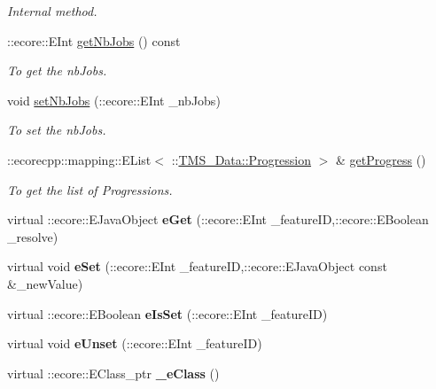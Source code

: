 \begin{DoxyCompactItemize}
\begin{DoxyCompactList}\small\item\em Internal method. \item\end{DoxyCompactList}\item 
::ecore::EInt \hyperlink{classTMS__Data_1_1ListProgression_a11b488649edac3b2358dd3d0d5cd27cd}{getNbJobs} () const 
\begin{DoxyCompactList}\small\item\em To get the nbJobs. \item\end{DoxyCompactList}\item 
void \hyperlink{classTMS__Data_1_1ListProgression_a7b7bb84e28a6725537b97ce45285c3e2}{setNbJobs} (::ecore::EInt \_\-nbJobs)
\begin{DoxyCompactList}\small\item\em To set the nbJobs. \item\end{DoxyCompactList}\item 
::ecorecpp::mapping::EList$<$ ::\hyperlink{classTMS__Data_1_1Progression}{TMS\_\-Data::Progression} $>$ \& \hyperlink{classTMS__Data_1_1ListProgression_a52390d2f627bb0241f8ed38da3195241}{getProgress} ()
\begin{DoxyCompactList}\small\item\em To get the list of Progressions. \item\end{DoxyCompactList}\item 
\hypertarget{classTMS__Data_1_1ListProgression_a5d323eaa4950c9e45d1fd046a3d7a3a3}{
virtual ::ecore::EJavaObject {\bfseries eGet} (::ecore::EInt \_\-featureID,::ecore::EBoolean \_\-resolve)}
\label{classTMS__Data_1_1ListProgression_a5d323eaa4950c9e45d1fd046a3d7a3a3}

\item 
\hypertarget{classTMS__Data_1_1ListProgression_a470c911717f8478995bcc36425fa5777}{
virtual void {\bfseries eSet} (::ecore::EInt \_\-featureID,::ecore::EJavaObject const \&\_\-newValue)}
\label{classTMS__Data_1_1ListProgression_a470c911717f8478995bcc36425fa5777}

\item 
\hypertarget{classTMS__Data_1_1ListProgression_aa5f1ea14a2ec2876666941463420949e}{
virtual ::ecore::EBoolean {\bfseries eIsSet} (::ecore::EInt \_\-featureID)}
\label{classTMS__Data_1_1ListProgression_aa5f1ea14a2ec2876666941463420949e}

\item 
\hypertarget{classTMS__Data_1_1ListProgression_a2ca51c566dc514e900dcefedb3711e34}{
virtual void {\bfseries eUnset} (::ecore::EInt \_\-featureID)}
\label{classTMS__Data_1_1ListProgression_a2ca51c566dc514e900dcefedb3711e34}

\item 
\hypertarget{classTMS__Data_1_1ListProgression_a548ce931d069688d6aeaa4bb98959604}{
virtual ::ecore::EClass\_\-ptr {\bfseries \_\-eClass} ()}
\label{classTMS__Data_1_1ListProgression_a548ce931d069688d6aeaa4bb98959604}

\end{DoxyCompactItemize}
